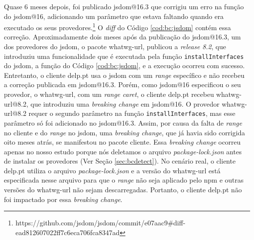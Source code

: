 Quase 6 meses depois, foi publicado \textsf{jsdom@16.3} que corrigiu um erro na função do \textsf{jsdom@16}, adicionando um parâmetro que estava faltando quando era executado os seus provedores.\footnote{https://github.com/jsdom/jsdom/commit/e07aac9\#diff-ead812607022ff7c6eca706fca8347ad} O \textit{diff} do Código \ref{cod:bc:jsdom} contém essa correção. Aproximadamente dois meses após da publicação do \textsf{jsdom@16.3}, um dos provedores do \textsf{jsdom}, o pacote \textsf{whatwg-url}, publicou a \textit{release 8.2}, que introduziu uma funcionalidade que é executada pela função \texttt{installInterfaces} do \textsf{jsdom}, a função do Código \ref{cod:bc:jsdom}, e a execução ocorreu com sucesso. Entretanto, o cliente \textsf{delp.pt} usa o \textsf{jsdom} com um \textit{range} específico e não recebeu a correção publicada em \textsf{jsdom@16.3}. Porém, como \textsf{jsdom@16} especificou o seu provedor, o \textsf{whatwg-url}, com um \textit{range caret}, o cliente \textsf{delp.pt} recebeu \textsf{whatwg-url@8.2}, que introduziu uma \textit{breaking change} em \textsf{jsdom@16}. O provedor \textsf{whatwg-url@8.2} requer o segundo parâmetro na função \texttt{installInterfaces}, mas esse parâmetro só foi adicionado no \textsf{jsdom@16.3}. Assim, por causa da falta de \textit{range} no cliente e do \textit{range} no \textsf{jsdom}, uma \textit{breaking change}, que já havia sido corrigida oito meses atrás, se manifestou no pacote cliente. Essa \textit{breaking change} ocorreu apenas no nosso estudo porque nós deletamos o arquivo \textit{package-lock.json} antes de instalar os provedores (Ver Seção \ref{sec:bcdetect}). No cenário real, o cliente \textsf{delp.pt} utiliza o arquivo \textit{package-lock.json} e a versão do \textsf{whatwg-url} está especificada nesse arquivo para que o \textit{range} não seja aplicado pelo \textsf{npm} e outras versões do \textsf{whatwg-url} não sejam descarregadas. Portanto, o cliente \textsf{delp.pt} não foi impactado por essa \textit{breaking change}.